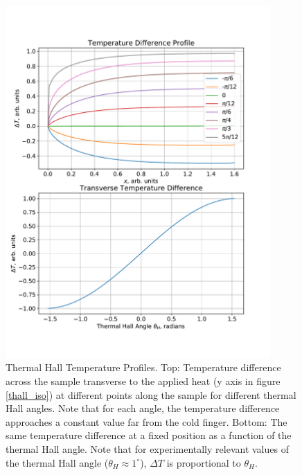 \documentclass{thesis-umich}
\begin{document}
\begin{figure}
\centering
\includegraphics[width=0.9\textwidth]{figures/thall_profile.pdf}
\caption[Thermal Hall Temperature Profiles]{Thermal Hall Temperature Profiles. Top: Temperature difference across
	the sample transverse to the applied heat (y axis in figure
	\ref{thall_iso}) at different points along the sample for different
	thermal Hall angles. Note that for each angle, the temperature
	difference approaches a constant value far from the cold finger.
	Bottom: The same temperature difference at a fixed position as a
function of the thermal Hall angle. Note that for experimentally relevant values of the thermal Hall angle (\(\theta_H \approx 1^\circ\)), \(\Delta T\) is proportional to \(\theta_H\).   \label{thall_prof}}
\end{figure}
\end{document}
